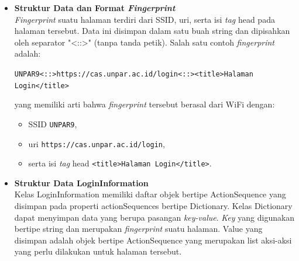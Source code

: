\documentclass[a4paper,twoside]{article}
\begin{document}
\begin{enumerate}
\begin{itemize}
{\begin{itemize}
{                        Algoritma di atas menjelaskan deteksi \textit{captive portal} dilakukan dengan melakukan deteksi jaringan yang tidak terhubung dengan internet. Jika ditemukan jaringan yang tidak terhubung dengan internet, maka akan muncul notifikasi yang memungkinkan pengguna untuk menjalankan perangkat lunak. Saat perangkat lunak dijalankan, perangkat lunak akan mencoba untuk mengakses halaman pancingan yang beralamatkan pada:
                        \begin{center}\texttt{http://107.172.253.111/network\_status.html}\end{center}
                        Jika didapat respon HTTP yang berupa \textit{redirect}, maka pada jaringan tersebut terdapat \textit{captive portal}. Algoritma ini akan didaftarkan pada sistem saat perangkat lunak pertama kali dijalankan dan dipanggil saat ada perubahan status jaringan.
                    }
                    \item{
                        {\bf Struktur Data dan Format \textit{Fingerprint}}\\
                        \textit{Fingerprint} suatu halaman terdiri dari SSID, uri, serta isi \textit{tag} head pada halaman tersebut. Data ini disimpan dalam satu buah string dan dipisahkan oleh separator "<::>" (tanpa tanda petik). Salah satu contoh \textit{fingerprint} adalah:
                        \begin{center}
                            \texttt{UNPAR9<::>https://cas.unpar.ac.id/login<::><title>Halaman Login</title>}
                        \end{center}
                        yang memiliki arti bahwa \textit{fingerprint} tersebut berasal dari WiFi dengan:
                        \begin{itemize}
                            \item{SSID \texttt{UNPAR9},}
                            \item{uri \texttt{https://cas.unpar.ac.id/login},}
                            \item{serta isi \textit{tag} head \texttt{<title>Halaman Login</title>}.}
                        \end{itemize}
                    }
                    \item{
                        {\bf Struktur Data LoginInformation}\\
                        Kelas LoginInformation memiliki daftar objek bertipe ActionSequence yang disimpan pada properti actionSequences bertipe Dictionary. Kelas Dictionary dapat menyimpan data yang berupa pasangan \textit{key-value}. \textit{Key} yang digunakan bertipe string dan merupakan \textit{fingerprint} suatu halaman. Value yang disimpan adalah objek bertipe ActionSequence yang merupakan list aksi-aksi yang perlu dilakukan untuk halaman tersebut.

}
\end{itemize}}
\end{itemize}
\end{enumerate}
\end{document}
